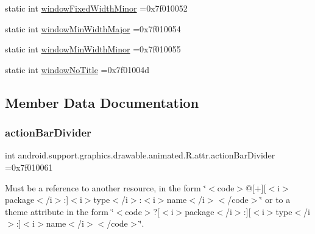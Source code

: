 \begin{DoxyCompactItemize}
\item 
static int \hyperlink{classandroid_1_1support_1_1graphics_1_1drawable_1_1animated_1_1R_1_1attr_ad5f5bd1f269448c1f507c538c532210c}{window\+Fixed\+Width\+Minor} =0x7f010052
\item 
static int \hyperlink{classandroid_1_1support_1_1graphics_1_1drawable_1_1animated_1_1R_1_1attr_a6690fed956f04f3595b8062079e49a33}{window\+Min\+Width\+Major} =0x7f010054
\item 
static int \hyperlink{classandroid_1_1support_1_1graphics_1_1drawable_1_1animated_1_1R_1_1attr_a73ac6096ddbad550532471e2e4870132}{window\+Min\+Width\+Minor} =0x7f010055
\item 
static int \hyperlink{classandroid_1_1support_1_1graphics_1_1drawable_1_1animated_1_1R_1_1attr_aa8ad9f246d10bfbada7375d07fc9472c}{window\+No\+Title} =0x7f01004d
\end{DoxyCompactItemize}


\subsection{Member Data Documentation}
\mbox{\label{classandroid_1_1support_1_1graphics_1_1drawable_1_1animated_1_1R_1_1attr_afb2032d0219186092ae876ff6c3c9e29}} 
\subsubsection{\texorpdfstring{action\+Bar\+Divider}{actionBarDivider}}
{\footnotesize\ttfamily int android.\+support.\+graphics.\+drawable.\+animated.\+R.\+attr.\+action\+Bar\+Divider =0x7f010061\hspace{0.3cm}{\ttfamily [static]}}

Must be a reference to another resource, in the form \char`\"{}$<$code$>$@\mbox{[}+\mbox{]}\mbox{[}$<$i$>$package$<$/i$>$\+:\mbox{]}$<$i$>$type$<$/i$>$\+:$<$i$>$name$<$/i$>$$<$/code$>$\char`\"{} or to a theme attribute in the form \char`\"{}$<$code$>$?\mbox{[}$<$i$>$package$<$/i$>$\+:\mbox{]}\mbox{[}$<$i$>$type$<$/i$>$\+:\mbox{]}$<$i$>$name$<$/i$>$$<$/code$>$\char`\"{}. \mbox{\label{classandroid_1_1support_1_1graphics_1_1drawable_1_1animated_1_1R_1_1attr_a4364ed8633d4db6e0e55992ce98dce9d}} 
